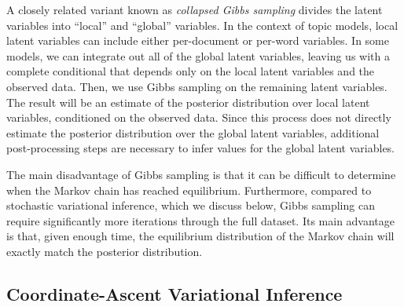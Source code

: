 \documentclass{article}
\begin{document}

A closely related variant known as \emph{collapsed Gibbs sampling} divides the latent variables into ``local'' and ``global'' variables.
In the context of topic models, local latent variables can include either per-document or per-word variables.
In some models, we can integrate out all of the global latent variables, leaving us with a complete conditional that depends only on the local latent variables and the observed data.
Then, we use Gibbs sampling on the remaining latent variables.
The result will be an estimate of the posterior distribution over local latent variables, conditioned on the observed data.
Since this process does not directly estimate the posterior distribution over the global latent variables, additional post-processing steps are necessary to infer values for the global latent variables.

The main disadvantage of Gibbs sampling is that it can be difficult to determine when the Markov chain has reached equilibrium.
Furthermore, compared to stochastic variational inference, which we discuss below, Gibbs sampling can require significantly more iterations through the full dataset.
Its main advantage is that, given enough time, the equilibrium distribution of the Markov chain will exactly match the posterior distribution.

\subsection{Coordinate-Ascent Variational Inference}
\label{sec:cavi}
\end{document}
